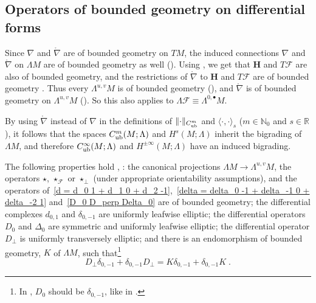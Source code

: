 \documentclass{memo-l}
\theoremstyle{plain}
\theoremstyle{definition}
\theoremstyle{remark}
\newcommand{\N}{\mathbb{N}}
\newcommand{\R}{\mathbb{R}}
\newcommand{\FF}{\mathcal{F}}
\newcommand{\bfH}{\boldsymbol{H}}
\newcommand{\rnabla}{\mathring{\nabla}}
\newcommand{\Cinftyub}{C^\infty_{\text{\rm ub}}}
\numberwithin{section}{chapter}
\numberwithin{equation}{section}%
\begin{document}
\subsection{Operators of bounded geometry on differential forms}\label{ss: opers of bd geom on diff forms}

Since $\nabla$ and $\rnabla$ are of bounded geometry on $TM$, the induced connections $\nabla$ and $\rnabla$ on $\Lambda M$ are of bounded geometry as well (). Using , we get that $\bfH$ and $T\FF$ are also of bounded geometry, and the restrictions of $\rnabla$ to $\bfH$ and $T\FF$ are of bounded geometry \cite[Section~6]{AlvKordyLeichtnam2020}. Thus every $\Lambda^{u,v}M$ is of bounded geometry (), and $\rnabla$ is of bounded geometry on $\Lambda^{u,v}M$ (). So this also applies to $\Lambda\FF\equiv\Lambda^{0,\bullet}M$.

By using $\rnabla$ instead of $\nabla$ in the definitions of $\|{\cdot}\|_{C_{\text{\rm ub}}^m}$ and $\langle\cdot,\cdot\rangle_s$ ($m\in\N_0$ and $s\in\R$), it follows that the spaces $C_{\text{\rm ub}}^m(M;\Lambda)$ and $H^s(M;\Lambda)$ inherit the bigrading of $\Lambda M$, and therefore $\Cinftyub(M;\Lambda)$ and $H^{\pm\infty}(M;\Lambda)$ have an induced bigrading. 

The following properties hold \cite[Section~3]{AlvKordy2001}, \cite[Section~6]{AlvKordyLeichtnam2020}: the canonical projections $\Lambda M\to\Lambda^{u,v}M$, the operators  $\star$, $\star_\FF$ or $\star_\perp$ (under appropriate orientability assumptions), and the operators of~\eqref{d = d_0 1 + d_1 0 + d_2 -1},~\eqref{delta = delta_0 -1 + delta_-1 0 + delta_-2 1} and~\eqref{D_0 D_perp Delta_0} are of bounded geometry; the differential complexes $d_{0,1}$ and $\delta_{0,-1}$ are uniformly leafwise elliptic; the differential operators $D_0$ and $\Delta_0$ are symmetric and uniformly leafwise elliptic; the differential operator $D_\perp$ is uniformly transversely elliptic; and there is an endomorphism of bounded geometry, $K$ of $\Lambda M$, such that\footnote{In \cite[Eq.~(55)]{AlvKordyLeichtnam2020}, $D_0$ should be $\delta_{0,-1}$, like in \cite[Proposition~3.1]{AlvKordy2001}.}
\begin{equation}\label{D_perp delta_0 -1 + delta_0 -1 D_perp}
D_\perp\delta_{0,-1}+\delta_{0,-1}D_\perp=K\delta_{0,-1}+\delta_{0,-1}K\;.
\end{equation}
\end{document}
